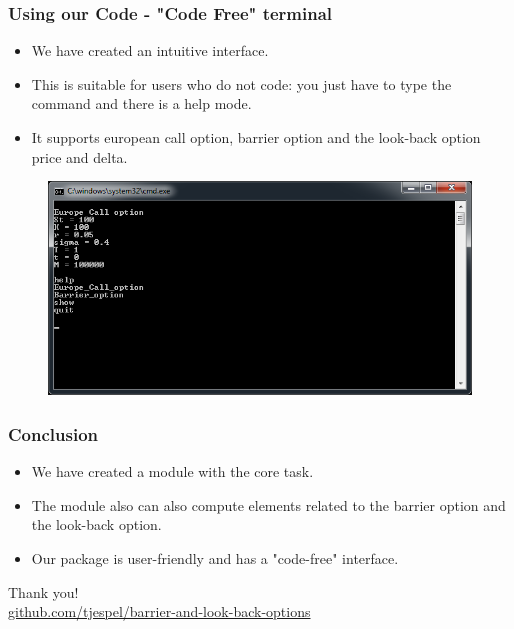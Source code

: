 \documentclass[12pt]{beamer}
\begin{document}
\begin{frame}
\frametitle{Using our Code - "Code Free" terminal}
\begin{itemize}
  \item We have created an intuitive interface.
  \item This is suitable for users who do not code: you just have to type the command and there is a help mode.
  \item It supports european call option, barrier option and the look-back option price and delta.
\end{itemize}
\begin{figure}[h!]
  \centering
\includegraphics[width=.8\textwidth]{graphs/interface_demo.png}
\end{figure}
\end{frame}



\begin{frame}
\frametitle{Conclusion}
\begin{itemize}
  \item We have created a module with the core task.
  \item The module also can also compute elements related to the barrier option and the look-back option.
  \item Our package is user-friendly and has a "code-free" interface.
\end{itemize}
\end{frame}



\begin{frame}

\centering
{\Large Thank you!}
\\[1cm]
{\small\url{github.com/tjespel/barrier-and-look-back-options}}
\end{frame}
\end{document}
